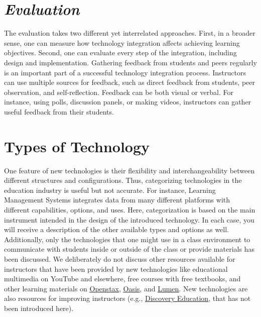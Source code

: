 \documentclass{book}
\begin{document}
\hypertarget{evaluation}{%
\section{\texorpdfstring{\emph{Evaluation}}{Evaluation}}\label{evaluation}}

The evaluation takes two different yet interrelated approaches. First, in a
broader sense, one can measure how technology integration affects achieving
learning objectives. Second, one can evaluate every step of the integration,
including design and implementation. Gathering feedback from students and
peers regularly is an important part of a successful technology integration
process. Instructors can use multiple sources for feedback, such as direct
feedback from students, peer observation, and self-reflection. Feedback can be
both visual or verbal. For instance, using polls, discussion panels, or making
videos, instructors can gather useful feedback from their students.

\hypertarget{types-of-technology}{%
\section{Types of Technology}\label{types-of-technology}}

One feature of new technologies is their flexibility and interchangeability
between different structures and configurations. Thus, categorizing
technologies in the education industry is useful but not accurate. For
instance, Learning Management Systems integrates data from many different
platforms with different capabilities, options, and uses. Here, categorization
is based on the main instrument intended in the design of the introduced
technology. In each case, you will receive a description of the other
available types and options as well. Additionally, only the technologies that
one might use in a class environment to communicate with students inside or
outside of the class or provide materials has been discussed. We deliberately
do not discuss other resources available for instructors that have been
provided by new technologies like educational multimedia on YouTube and
elsewhere, free courses with free textbooks, and other learning materials on
\href{https://openstax.org/about}{\underline{Openstax}},
\href{https://oasis.geneseo.edu/index.php}{\underline{Oasis}}, and
\href{https://lumenlearning.com/}{\underline{Lumen}}. New technologies are
also resources for improving instructors (e.g.,
\href{https://www.discoveryeducation.com/}{\underline{Discovery Education}},
that has not been introduced here).
\end{document}
